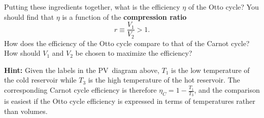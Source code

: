 \documentclass[12 pt]{article} %
\begin{document}
Putting these ingredients together, what is the efficiency $\eta$ of the Otto cycle?
You should find that $\eta$ is a function of the \textbf{compression ratio}
\begin{equation*}
  r \equiv \frac{V_1}{V_2} > 1.
\end{equation*}
How does the efficiency of the Otto cycle compare to that of the Carnot cycle?
How should $V_1$ and $V_2$ be chosen to maximize the efficiency?

\textbf{Hint:} Given the labels in the PV~diagram above, $T_1$ is the low temperature of the cold reservoir while $T_3$ is the high temperature of the hot reservoir.
The corresponding Carnot cycle efficiency is therefore $\eta_C = 1 - \frac{T_1}{T_3}$, and the comparison is easiest if the Otto cycle efficiency is expressed in terms of temperatures rather than volumes.
\end{document}
